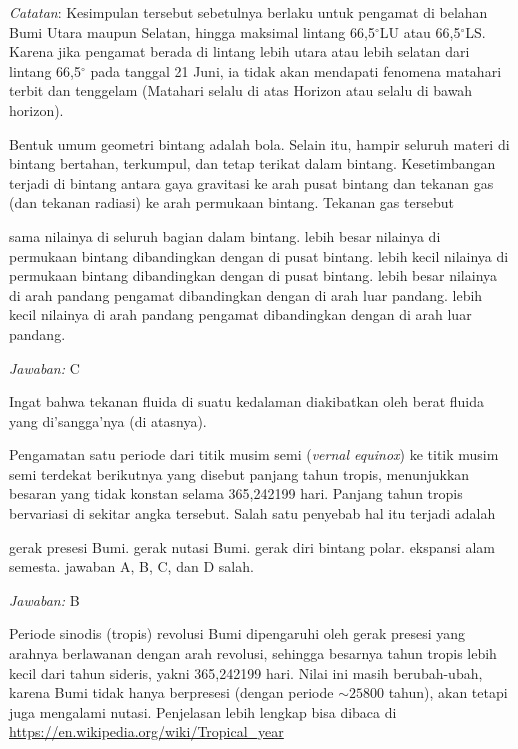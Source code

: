 \documentclass[11pt,fleqn]{exam}
\begin{document}
\begin{questions}
\textit{Catatan}: Kesimpulan tersebut sebetulnya berlaku untuk pengamat di belahan Bumi Utara maupun Selatan, hingga maksimal lintang 66,5$^{\circ}$LU atau 66,5$^{\circ}$LS. Karena jika pengamat berada di lintang lebih utara atau lebih selatan dari lintang 66,5$^{\circ}$ pada tanggal 21 Juni, ia tidak akan mendapati fenomena matahari terbit dan tenggelam (Matahari selalu di atas Horizon atau selalu di bawah horizon).




\question Bentuk umum geometri bintang adalah bola. Selain itu, hampir seluruh materi di bintang bertahan, terkumpul, dan tetap terikat dalam bintang. Kesetimbangan terjadi di bintang antara gaya gravitasi ke arah pusat bintang dan tekanan gas (dan tekanan radiasi) ke arah permukaan bintang. Tekanan gas tersebut
\begin{choices}
\choice sama nilainya di seluruh bagian dalam bintang.
\choice lebih besar nilainya di permukaan bintang dibandingkan dengan di pusat bintang.
\choice lebih kecil nilainya di permukaan bintang dibandingkan dengan di pusat bintang.
\choice lebih besar nilainya di arah pandang pengamat dibandingkan dengan di arah luar pandang.
\choice lebih kecil nilainya di arah pandang pengamat dibandingkan dengan di arah luar pandang.
\end{choices}

\textit{Jawaban: } C

Ingat bahwa tekanan fluida di suatu kedalaman diakibatkan oleh berat fluida yang di'sangga'nya (di atasnya).




\question Pengamatan satu periode dari titik musim semi (\textit{vernal equinox}) ke titik musim semi terdekat berikutnya yang disebut panjang tahun tropis, menunjukkan besaran yang tidak konstan selama 365,242199 hari. Panjang tahun tropis bervariasi di sekitar angka tersebut. Salah satu penyebab hal itu terjadi adalah 
\begin{choices}
\choice gerak presesi Bumi.
\choice gerak nutasi Bumi.
\choice gerak diri bintang polar.
\choice ekspansi alam semesta.
\choice jawaban A, B, C, dan D salah.
\end{choices}

\textit{Jawaban: } B

Periode sinodis (tropis) revolusi Bumi dipengaruhi oleh gerak presesi yang arahnya berlawanan dengan arah revolusi, sehingga besarnya tahun tropis lebih kecil dari tahun sideris, yakni 365,242199 hari. Nilai ini masih berubah-ubah, karena Bumi tidak hanya berpresesi (dengan periode $\sim 25800$ tahun), akan tetapi juga mengalami nutasi. Penjelasan lebih lengkap bisa dibaca di \url{https://en.wikipedia.org/wiki/Tropical_year}





\end{questions}
\end{document}
